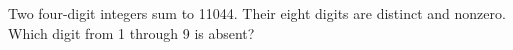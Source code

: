 Two four-digit integers sum to 11044. Their eight digits are distinct and nonzero. Which digit from 1 through 9 is absent?
